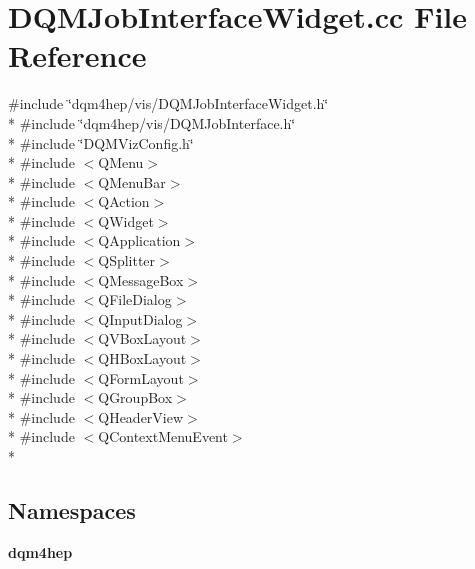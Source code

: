 \section{D\+Q\+M\+Job\+Interface\+Widget.\+cc File Reference}
\label{DQMJobInterfaceWidget_8cc}
{\ttfamily \#include \char`\"{}dqm4hep/vis/\+D\+Q\+M\+Job\+Interface\+Widget.\+h\char`\"{}}\\*
{\ttfamily \#include \char`\"{}dqm4hep/vis/\+D\+Q\+M\+Job\+Interface.\+h\char`\"{}}\\*
{\ttfamily \#include \char`\"{}D\+Q\+M\+Viz\+Config.\+h\char`\"{}}\\*
{\ttfamily \#include $<$Q\+Menu$>$}\\*
{\ttfamily \#include $<$Q\+Menu\+Bar$>$}\\*
{\ttfamily \#include $<$Q\+Action$>$}\\*
{\ttfamily \#include $<$Q\+Widget$>$}\\*
{\ttfamily \#include $<$Q\+Application$>$}\\*
{\ttfamily \#include $<$Q\+Splitter$>$}\\*
{\ttfamily \#include $<$Q\+Message\+Box$>$}\\*
{\ttfamily \#include $<$Q\+File\+Dialog$>$}\\*
{\ttfamily \#include $<$Q\+Input\+Dialog$>$}\\*
{\ttfamily \#include $<$Q\+V\+Box\+Layout$>$}\\*
{\ttfamily \#include $<$Q\+H\+Box\+Layout$>$}\\*
{\ttfamily \#include $<$Q\+Form\+Layout$>$}\\*
{\ttfamily \#include $<$Q\+Group\+Box$>$}\\*
{\ttfamily \#include $<$Q\+Header\+View$>$}\\*
{\ttfamily \#include $<$Q\+Context\+Menu\+Event$>$}\\*
\subsection*{Namespaces}
\begin{DoxyCompactItemize}
\item 
 {\bf dqm4hep}
\end{DoxyCompactItemize}
